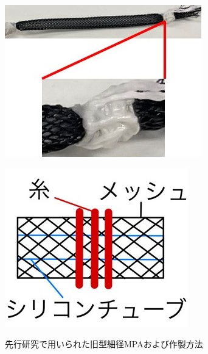 \begin{figure}[htbp]
  \begin{minipage}{0.49\hsize}
    \centering  
    \includegraphics[scale=0.6]{image/MPA_tanbu_1_1.jpg}
    \label{fig:MPA_tanbu_1_1}
  \end{minipage}
  \begin{minipage}{0.5\hsize}
    \centering
    \includegraphics[scale=0.6]{image/MPA_tanbu_1_2.jpg}
    \label{fig:MPA_tanbu_1_2}
  \end{minipage}
  \caption{先行研究で用いられた旧型細径MPAおよび作製方法}
  \label{fig:MPA_tanbu_1}
\end{figure}
%

